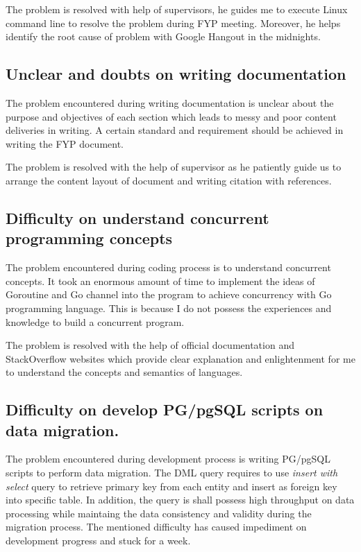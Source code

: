The problem is resolved with help of supervisors, he guides me to execute Linux command line to resolve the problem during FYP meeting. Moreover, he helps identify the root cause of problem with Google Hangout in the midnights. 

\subsection{Unclear and doubts on writing documentation}

The problem encountered during writing documentation is unclear about the purpose and objectives of each section which leads to messy and poor content deliveries in writing. A certain standard and requirement should be achieved in writing the FYP document.

The problem is resolved with the help of supervisor as he patiently guide us to arrange the content layout of document and writing citation with references.  

\subsection{Difficulty on understand concurrent programming concepts}

The problem encountered during coding process is to understand concurrent concepts. It took an enormous amount of time to implement the ideas of Goroutine and Go channel into the program to achieve concurrency with Go programming language. This is because I do not possess the experiences and knowledge to build a concurrent program.

The problem is resolved with the help of official documentation and StackOverflow websites which provide clear explanation and enlightenment for me to understand the concepts and semantics of languages. 

\subsection{Difficulty on develop PG/pgSQL scripts on data migration.}

The problem encountered during development process is writing PG/pgSQL scripts to perform data migration. The DML query requires to use \textit{insert with select} query to retrieve primary key from each entity and insert as foreign key into specific table. In addition, the query is shall possess high throughput on data processing while maintaing the data consistency and validity during the migration process. The mentioned difficulty has caused impediment on development progress and stuck for a week. 

